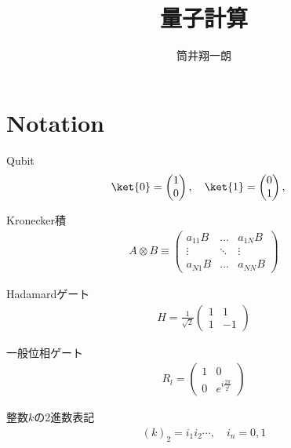 \documentclass[]{ltjsarticle}
\begin{document}
\title{量子計算}


\author{筒井翔一朗}


\maketitle
\tableofcontents


\section{Notation}
Qubit
\begin{align}
    \ket{0} 
    = 
    \begin{pmatrix}
    1 \\ 0    
    \end{pmatrix}, \quad 
    \ket{1} 
    = 
    \begin{pmatrix}
    0 \\ 1    
    \end{pmatrix}, \quad 
\end{align}

Kronecker積
\begin{align}
    A \otimes B 
    \equiv
    \begin{pmatrix}
        a_{11}B & \dots & a_{1N}B \\
        \vdots & \ddots & \vdots \\
        a_{N1}B & \dots & a_{NN}B
    \end{pmatrix}
\end{align}

Hadamardゲート
\begin{align}
    H 
    = 
    \frac{1}{\sqrt{2}}
    \begin{pmatrix}
        1 & 1 \\
        1 & -1
    \end{pmatrix}
\end{align}

一般位相ゲート
\begin{align}
    R_l
    =
    \begin{pmatrix}
        1 & 0 \\
        0 & e^{i\frac{2\pi}{2^l}}
    \end{pmatrix}
\end{align}

整数$k$の2進数表記
\begin{align}
    (k)_2 = i_1 i_2 \cdots, \quad i_n = 0, 1
\end{align}
\end{document}
